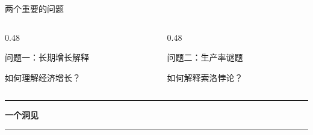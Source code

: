 \documentclass[aspectratio=169,10pt]{beamer}
\begin{document}
\begin{frame}{两个重要的问题}

  \vspace{0.45cm}

  \begin{columns}[c,onlytextwidth]
    \begin{column}{0.48\linewidth}
      \begin{block}{问题一：长期增长解释}
        \centering
        \vspace{0.18cm}

        {\Large 如何理解经济增长？}

        \vspace{0.25cm}


        \vspace{0.18cm}
      \end{block}
    \end{column}

    \begin{column}{0.48\linewidth}
      \begin{block}{问题二：生产率谜题}
        \centering
        \vspace{0.18cm}

        {\Large 如何解释索洛悖论？}

        \vspace{0.25cm}


        \vspace{0.18cm}
      \end{block}
    \end{column}
  \end{columns}

\end{frame}

\begin{frame}[t]
  \vfill
  \begin{center}
    {\color{ModernRed}\rule{0.2\linewidth}{0.9pt}\par}
    \vspace{0.35cm}
    {\bfseries\fontsize{38}{46}\selectfont 一个洞见 \par}
    \vspace{0.3cm}
    {\color{ModernRed}\rule{0.2\linewidth}{0.9pt}\par}
  \end{center}
  \vfill
\end{frame}
\end{document}
